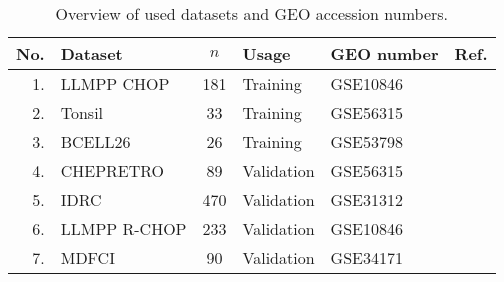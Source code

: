 \begin{table}%
\small
\caption{Overview of used datasets and GEO accession numbers.}
\label{table:01}%
\begin{center}
\begin{tabular}{rlclll}
\hline\hline
No. & Dataset & $n$ & Usage & GEO number & Ref.
\\
\hline
1. & LLMPP CHOP & 181 & Training & GSE10846 & \cite{Lenz2008a}
\\
2. & Tonsil & 33 & Training & GSE56315 & \cite{DybkaerBoegsted2015}
\\
3. & BCELL26 & 26 & Training & GSE53798 & \cite{Falgreen2015}
\\
4. & CHEPRETRO & 89 & Validation & GSE56315 & \cite{DybkaerBoegsted2015}
\\
5. & IDRC & 470 & Validation & GSE31312 & \cite{Visco2012}
\\
6. & LLMPP R-CHOP & 233 & Validation & GSE10846 & \cite{Lenz2008a}
\\
7. & MDFCI & 90 & Validation & GSE34171 & \cite{Monti2012a}\\
\hline
\end{tabular}
\end{center}
\end{table}
